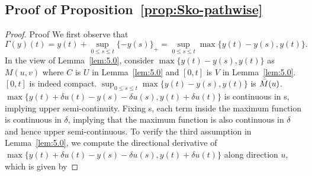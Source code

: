 \documentclass[11pt,leqno]{amsart}
\begin{document}
 \subsection{Proof of Proposition~\ref{prop:Sko-pathwise}}
 \begin{proof}{Proof}%
We first observe that $$\Gamma(y)(t) = y(t) + \sup_{0\leq s\leq t}\{-y(s)\}_+ = \sup_{0\leq s\leq t}\max\{y(t)-y(s), y(t)\}.$$
In the view of Lemma~\ref{lem:5.0}, consider $\max\{y(t)-y(s), y(t)\}$ as $M(u,v)$ where $C$ is $U$ in Lemma~\ref{lem:5.0} and $[0, t]$ is $V$ in Lemma~\ref{lem:5.0}. $[0, t]$ is indeed compact.  $\sup_{0\leq s\leq t}\max\{y(t)-y(s), y(t)\}$ is $\Bar{M}(u)$. $\max\{y(t)+\delta u(t)-y(s) -\delta u(s), y(t)+\delta u(t)\}$ is continuous in s, implying upper semi-continuity. Fixing s, each term inside the maximum function is continuous in $\delta$, implying that the maximum function is also continuous in $\delta$ and hence upper semi-continuous. To verify the third assumption in Lemma~\ref{lem:5.0}, we compute the directional derivative of $\max\{y(t)+\delta u(t)-y(s)-\delta u(s), y(t)+\delta u(t)\}$ along direction $u$, which is given by


\end{proof}
\end{document}
